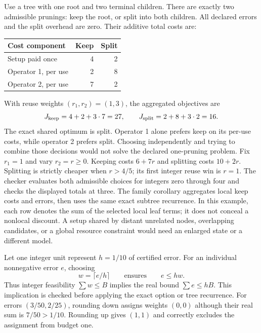 Use a tree with one root and two terminal children. There are exactly two admissible prunings: keep the root, or split into both children. All declared errors and the split overhead are zero. Their additive total costs are:
\begin{center}
\begin{tabular}{lrr}\toprule
Cost component & Keep & Split\\\midrule
Setup paid once & 4 & 2\\
Operator 1, per use & 2 & 8\\
Operator 2, per use & 7 & 2\\\bottomrule
\end{tabular}
\end{center}
With reuse weights $(r_1,r_2)=(1,3)$, the aggregated objectives are
\[
J_{\rm keep}=4+2+3\cdot7=27,\qquad
J_{\rm split}=2+8+3\cdot2=16.
\]
The exact shared optimum is split. Operator 1 alone prefers keep on its per-use costs, while operator 2 prefers split. Choosing independently and trying to combine those decisions would not solve the declared one-pruning problem.
Fix $r_1=1$ and vary $r_2=r\ge0$. Keeping costs $6+7r$ and splitting costs $10+2r$. Splitting is strictly cheaper when $r>4/5$; its first integer reuse win is $r=1$. The checker evaluates both admissible choices for integers zero through four and checks the displayed totals at three.
The family corollary aggregates local keep costs and errors, then uses the same exact subtree recurrence. In this example, each row denotes the sum of the selected local leaf terms; it does not conceal a nonlocal discount. A setup shared by distant unrelated nodes, overlapping candidates, or a global resource constraint would need an enlarged state or a different model.

Let one integer unit represent $h=1/10$ of certified error. For an individual nonnegative error $e$, choosing
\[
w=\lceil e/h\rceil\qquad\text{ensures}\qquad e\le hw.
\]
Thus integer feasibility $\sum w\le B$ implies the real bound $\sum e\le hB$. This implication is checked before applying the exact option or tree recurrence.
For errors $(3/50,2/25)$, rounding down assigns weights $(0,0)$ although their real sum is $7/50>1/10$. Rounding up gives $(1,1)$ and correctly excludes the assignment from budget one.

